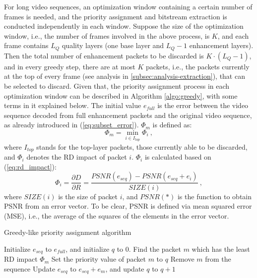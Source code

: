 \documentclass[journal]{IEEEtran}
\begin{document}
For long video sequences, an optimization window containing a certain number of frames is needed, and the priority assignment and bitstream extraction is conducted independently in each window. Suppose the size of the optimization window, i.e., the number of frames involved in the above process, is $K$, and each frame contains $L_Q$ quality layers (one base layer and $L_Q-1$ enhancement layers). Then the total number of enhancement packets to be discarded is $K \cdot (L_Q-1)$, and in every greedy step, there are at most $K$ packets, i.e., the packets currently at the top of every frame (see analysis in \ref{subsec:analysis-extraction}), that can be selected to discard. Given that, the priority assignment process in each optimization window can be described in Algorithm \ref{algo:greedy}, with some terms in it explained below. The initial value $e_{full}$ is the error between the video sequence decoded from full enhancement packets and the original video sequence, as already introduced in (\ref{eq:subset_error}). $\Phi_m$ is defined as:
\begin{equation}
\label{eq:R-D_impact_m}
\Phi_m = \min_{i \in I_{top}} \Phi_i \: ,
\end{equation}
where $I_{top}$ stands for the top-layer packets, those currently able to be discarded, and $\Phi_i$ denotes the RD impact of packet $i$. $\Phi_i$ is calculated based on (\ref{eq:rd_impact}):
\begin{equation}
\label{eq:R-D_impact_i}
\Phi_i = \dfrac{\partial D}{\partial R} = \dfrac{PSNR(e_{seq}) - PSNR(e_{seq} + e_i)}{SIZE(i)} \:,
\end{equation}
where $SIZE(i)$ is the size of packet $i$, and $PSNR(*)$ is the function to obtain PSNR from an error vector. To be clear, PSNR is defined via mean squared error (MSE), i.e., the average of the squares of the elements in the error vector.

\begin{algorithm}
\caption{Greedy-like priority assignment algorithm}
\label{algo:greedy}
\begin{algorithmic}
    \STATE Initialize $e_{seq}$ to $e_{full}$, and initialize $q$ to 0.
		    \STATE Find the packet $m$ which has the least RD impact $\Phi_m$
		\ENDFOR
		\STATE Set the priority value of packet $m$ to $q$
		\STATE Remove $m$ from the sequence
		\STATE Update $e_{seq}$ to $e_{seq} + e_m$, and update $q$ to $q+1$
    \ENDWHILE
\end{algorithmic}
\end{algorithm}
\end{document}
